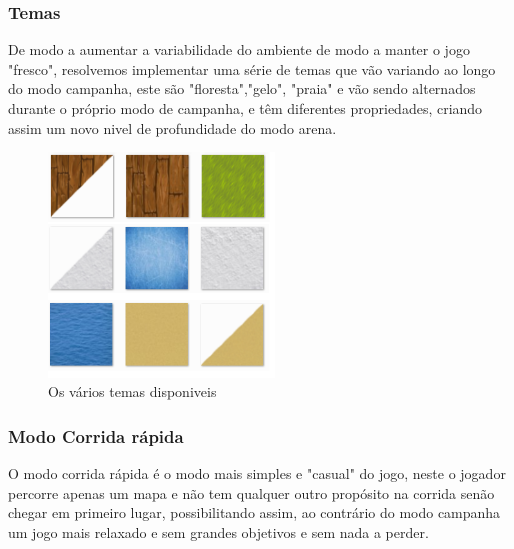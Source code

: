\documentclass[a4paper]{report} %
\begin{document}
\vfill
\clearpage

\subsubsection{Temas}
De modo a aumentar a variabilidade do ambiente de modo a manter o jogo "fresco", resolvemos implementar uma série de temas que vão variando ao longo do modo campanha, este são "floresta","gelo", "praia" e vão sendo alternados durante o próprio modo de campanha, e têm diferentes propriedades, criando assim um novo nivel de profundidade do modo arena.

\begin{figure}[tb]
\begin{center}
\includegraphics[width=6cm]{Temas.png}
\end{center}
\caption{Os vários temas disponiveis}
\end{figure}

\subsubsection{Modo Corrida rápida}
O modo corrida rápida é o modo mais simples e "casual" do jogo, neste o jogador percorre apenas um mapa e não tem qualquer outro propósito na corrida senão chegar em primeiro lugar, possibilitando assim, ao contrário do modo campanha um jogo mais relaxado e sem grandes objetivos e sem nada a perder.
\end{document}
